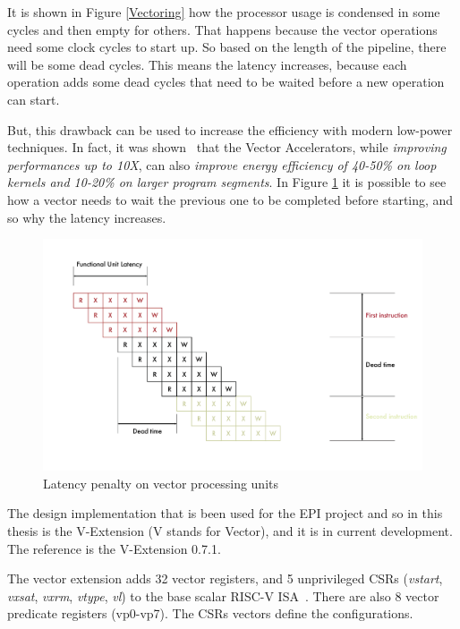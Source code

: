 It is shown in Figure \ref{Vectoring} how the processor usage is condensed in some cycles and then empty for others. That happens because the vector operations need some clock cycles to start up. So based on the length of the pipeline, there will be some dead cycles.
This means the latency increases, because each operation adds some dead cycles that need to be waited before a new operation can start.

But, this drawback can be used to increase the efficiency with modern low-power techniques. In fact, it was shown~\cite{Lemuet2006} that the Vector Accelerators, while \emph{improving performances up to 10X}, can also \emph{improve energy efficiency of \mbox{40-50\%} on loop kernels and \mbox{10-20\%} on larger program segments}.
In Figure \ref{Vector-Latency} it is possible to see how a vector needs to wait the previous one to be completed before starting, and so why the latency increases. 

\begin{figure}[H]
    \centering
    \includegraphics[scale = 0.5]{Chapter_1/img/lat-pen.png}
    \caption{Latency penalty on vector processing units~\cite{L15-Krste}}
    \label{Vector-Latency}
\end{figure}


The design implementation that is been used for the EPI project and so in this thesis is the V-Extension (V stands for Vector), and it is in current development. The reference is the V-Extension 0.7.1.

The vector extension adds 32 vector registers, and 5 unprivileged CSRs (\emph{vstart}, \emph{vxsat}, \emph{vxrm}, \emph{vtype}, \emph{vl}) to the base scalar \mbox{RISC-V} ISA~\cite{riscv-v-specs}.
There are also 8 vector predicate registers (vp0-vp7). The CSRs vectors define the configurations.

